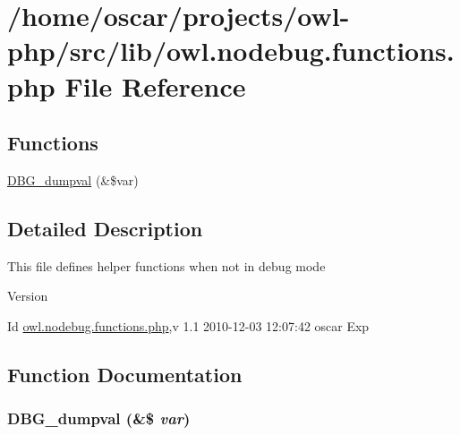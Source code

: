 \section{/home/oscar/projects/owl-\/php/src/lib/owl.nodebug.functions.php File Reference}
\label{owl_8nodebug_8functions_8php}
\subsection*{Functions}
\begin{DoxyCompactItemize}
\item 
\hyperlink{owl_8nodebug_8functions_8php_a65a2d146de0c2b3a89eb4c118a88905f}{DBG\_\-dumpval} (\&\$var)
\end{DoxyCompactItemize}


\subsection{Detailed Description}
This file defines helper functions when not in debug mode \begin{DoxyVersion}{Version}

\end{DoxyVersion}
\begin{DoxyParagraph}{Id}
\hyperlink{owl_8nodebug_8functions_8php}{owl.nodebug.functions.php},v 1.1 2010-\/12-\/03 12:07:42 oscar Exp 
\end{DoxyParagraph}


\subsection{Function Documentation}
\subsubsection[{DBG\_\-dumpval}]{\setlength{\rightskip}{0pt plus 5cm}DBG\_\-dumpval (\&\$ {\em var})}\label{owl_8nodebug_8functions_8php_a65a2d146de0c2b3a89eb4c118a88905f}

